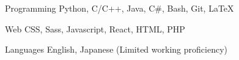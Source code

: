 

\begin{cvskills}

  \cvskill
    {Programming} %
    {Python, C/C++, Java, C\#, Bash, Git, LaTeX} %

  \cvskill
    {Web} %
    {CSS, Sass, Javascript, React, HTML, PHP} %

  \cvskill
    {Languages} %
    {English, Japanese (Limited working proficiency)} %

\end{cvskills}
